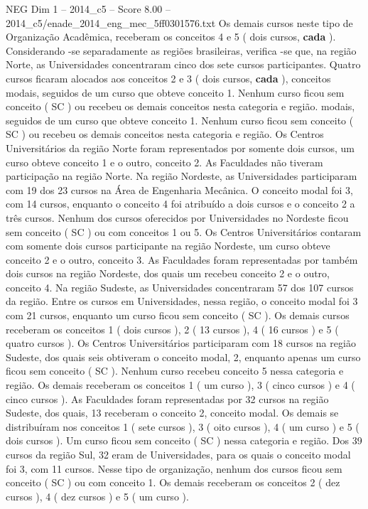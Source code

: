 \begin{textsample}{NEG Dim 1 – 2014\_c5 – Score 8.00 – 2014\_c5/enade\_2014\_eng\_mec\_5ff0301576.txt}
Os demais cursos neste tipo de Organização Acadêmica, receberam os conceitos 4 e 5 ( dois cursos, \textbf{cada} ).
Considerando -se separadamente as regiões brasileiras, verifica -se que, na região Norte, as Universidades concentraram cinco dos sete cursos participantes.
Quatro cursos ficaram alocados aos conceitos 2 e 3 ( dois cursos, \textbf{cada} ), conceitos modais, seguidos de um curso que obteve conceito 1.
Nenhum curso ficou sem conceito ( SC ) ou recebeu os demais conceitos nesta categoria e região. modais, seguidos de um curso que obteve conceito 1.
Nenhum curso ficou sem conceito ( SC ) ou recebeu os demais conceitos nesta categoria e região.
Os Centros Universitários da região Norte foram representados por somente dois cursos, um curso obteve conceito 1 e o outro, conceito 2.
As Faculdades não tiveram participação na região Norte.
Na região Nordeste, as Universidades participaram com 19 dos 23 cursos na Área de Engenharia Mecânica.
O conceito modal foi 3, com 14 cursos, enquanto o conceito 4 foi atribuído a dois cursos e o conceito 2 a três cursos.
Nenhum dos cursos oferecidos por Universidades no Nordeste ficou sem conceito ( SC ) ou com conceitos 1 ou 5.
Os Centros Universitários contaram com somente dois cursos participante na região Nordeste, um curso obteve conceito 2 e o outro, conceito 3.
As Faculdades foram representadas por também dois cursos na região Nordeste, dos quais um recebeu conceito 2 e o outro, conceito 4.
Na região Sudeste, as Universidades concentraram 57 dos 107 cursos da região.
Entre os cursos em Universidades, nessa região, o conceito modal foi 3 com 21 cursos, enquanto um curso ficou sem conceito ( SC ).
Os demais cursos receberam os conceitos 1 ( dois cursos ), 2 ( 13 cursos ), 4 ( 16 cursos ) e 5 ( quatro cursos ).
Os Centros Universitários participaram com 18 cursos na região Sudeste, dos quais seis obtiveram o conceito modal, 2, enquanto apenas um curso ficou sem conceito ( SC ).
Nenhum curso recebeu conceito 5 nessa categoria e região.
Os demais receberam os conceitos 1 ( um curso ), 3 ( cinco cursos ) e 4 ( cinco cursos ).
As Faculdades foram representadas por 32 cursos na região Sudeste, dos quais, 13 receberam o conceito 2, conceito modal.
Os demais se distribuíram nos conceitos 1 ( sete cursos ), 3 ( oito cursos ), 4 ( um curso ) e 5 ( dois cursos ).
Um curso ficou sem conceito ( SC ) nessa categoria e região.
Dos 39 cursos da região Sul, 32 eram de Universidades, para os quais o conceito modal foi 3, com 11 cursos.
Nesse tipo de organização, nenhum dos cursos ficou sem conceito ( SC ) ou com conceito 1.
Os demais receberam os conceitos 2 ( dez cursos ), 4 ( dez cursos ) e 5 ( um curso ).

\end{textsample}
